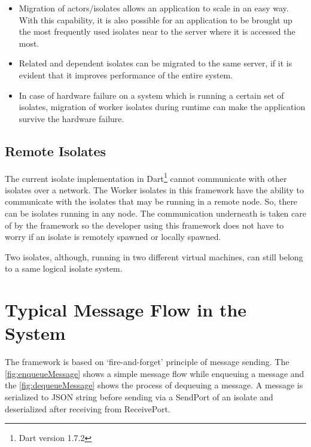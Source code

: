 \begin{itemize}

  \item Migration of actors/isolates allows an application to scale in an easy way. With this capability, it is also possible for an application to be brought up the most frequently used isolates near to the server where it is accessed the most.

  \item Related and dependent isolates can be migrated to the same server, if it is evident that it improves performance of the entire system.

  \item In case of hardware failure on a system which is running a certain set of isolates, migration of worker isolates during runtime can make the application survive the hardware failure.

\end{itemize}

\subsection{Remote Isolates}
\label{subsec:remoteIsolate}
  The current isolate implementation in Dart\footnote{Dart version 1.7.2} cannot communicate with other isolates over a network. The Worker isolates in this framework have the ability to communicate with the isolates that may be running in a remote node. So, there can be isolates running in any node. The communication underneath is taken care of by the framework so the developer using this framework does not have to worry if an isolate is remotely spawned or locally spawned.

  Two isolates, although, running in two different virtual machines, can still belong to a same logical isolate system.

\section{Typical Message Flow in the System}
The framework is based on ‘fire-and-forget’ principle of message sending. The \autoref{fig:enqueueMessage} shows a simple message flow while enqueuing a message and the \autoref{fig:dequeueMessage} shows the process of dequeuing a message.
A message is serialized to JSON string before sending via a SendPort of an isolate and deserialized after receiving from ReceivePort.

